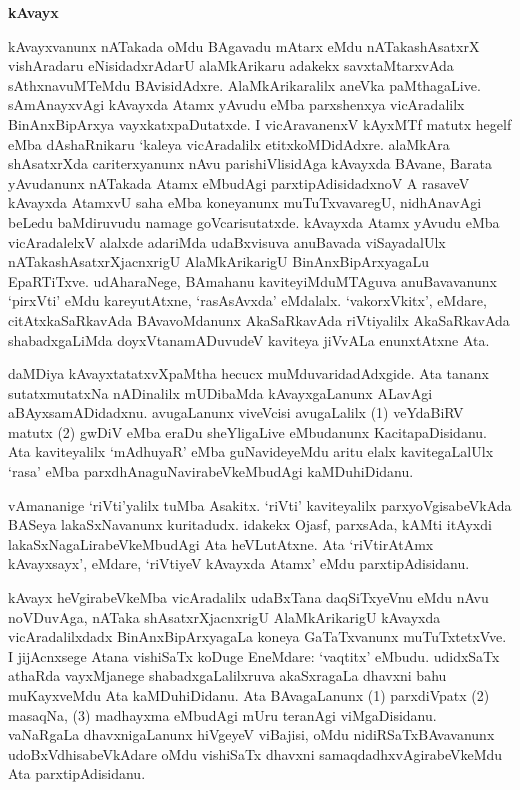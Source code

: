 \smallskip
\begin{center}
{\Large\bf kAvayx}
\end{center}

kAvayxvanunx nATakada oMdu BAgavadu mAtarx eMdu nATakashAsatxrX vishAradaru eNisidadxrAdarU alaMkArikaru adakekx savxtaMtarxvAda sAthxnavuMTeMdu BAvisidAdxre. AlaMkArikaralilx aneVka paMthagaLive. sAmAnayxvAgi kAvayxda Atamx yAvudu eMba parxshenxya vicAradalilx BinAnxBipArxya vayxkatxpaDutatxde. I vicAravanenxV kAyxMTf matutx hegelf eMba dAshaRnikaru `kaleya vicAradalilx etitxkoMDidAdxre. alaMkAra shAsatxrXda cariterxyanunx nAvu parishiVlisidAga kAvayxda BAvane, Barata yAvudanunx nATakada Atamx eMbudAgi parxtipAdisidadxnoV A rasaveV kAvayxda AtamxvU saha eMba koneyanunx muTuTxvavaregU, nidhAnavAgi beLedu baMdiruvudu namage goVcarisutatxde. kAvayxda Atamx yAvudu eMba vicAradalelxV alalxde adariMda udaBxvisuva anuBavada viSayadalUlx nATakashAsatxrXjacnxrigU AlaMkArikarigU BinAnxBipArxyagaLu EpaRTiTxve. udAharaNege, BAmahanu kaviteyiMduMTAguva anuBavavanunx `pirxVti' eMdu kareyutAtxne, `rasAsAvxda' eMdalalx. `vakorxVkitx', eMdare, citAtxkaSaRkavAda BAvavoMdanunx AkaSaRkavAda riVtiyalilx AkaSaRkavAda shabadxgaLiMda doyxVtanamADuvudeV kaviteya jiVvALa enunxtAtxne Ata.

daMDiya kAvayxtatatxvXpaMtha hecucx muMduvaridadAdxgide. Ata tananx sutatxmutatxNa nADinalilx mUDibaMda kAvayxgaLanunx ALavAgi aBAyxsamADidadxnu. avugaLanunx viveVcisi avugaLalilx (1) veYdaBiRV matutx (2) gwDiV eMba eraDu sheYligaLive eMbudanunx KacitapaDisidanu. Ata kaviteyalilx `mAdhuyaR' eMba guNavideyeMdu aritu elalx kavitegaLalUlx `rasa' eMba parxdhAnaguNavirabeVkeMbudAgi kaMDuhiDidanu.

vAmananige `riVti'yalilx tuMba Asakitx. `riVti' kaviteyalilx parxyoVgisabeVkAda BASeya lakaSxNavanunx kuritadudx. idakekx Ojasf, parxsAda, kAMti itAyxdi lakaSxNagaLirabeVkeMbudAgi Ata heVLutAtxne. Ata `riVtirAtAmx kAvayxsayx', eMdare, `riVtiyeV kAvayxda Atamx' eMdu parxtipAdisidanu.

kAvayx heVgirabeVkeMba vicAradalilx udaBxTana daqSiTxyeVnu eMdu nAvu noVDu\-vAga, nATaka shAsatxrXjacnxrigU AlaMkArikarigU kAvayxda vicAradalilxdadx BinAnxBipArxyagaLa koneya GaTaTxvanunx muTuTxtetxVve. I jijAcnxsege Atana vishiSaTx koDuge EneMdare: `vaqtitx' eMbudu. udidxSaTx athaRda vayxMjanege shabadxgaLalilxruva akaSxragaLa dhavxni bahu muKayxveMdu Ata kaMDuhiDidanu. Ata BAvagaLanunx (1) parxdiVpatx (2) masaqNa, (3) madhayxma eMbudAgi mUru teranAgi viMgaDisidanu. vaNaRgaLa dhavxnigaLanunx hiVgeyeV viBajisi, oMdu nidiRSaTxBAvavanunx udoBxVdhisabeVkAdare oMdu vishiSaTx dhavxni samaqdadhxvAgirabeVkeMdu Ata parxtipAdisidanu.

